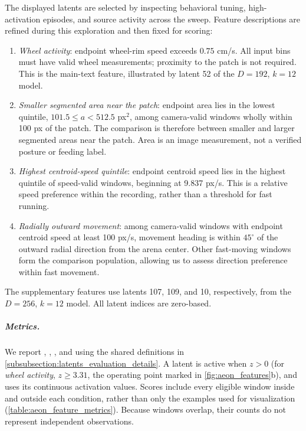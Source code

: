 The displayed latents are selected by inspecting behavioral tuning, high-activation episodes, and source activity across the sweep. Feature descriptions are refined during this exploration and then fixed for scoring:
\begin{enumerate}[leftmargin=*,itemsep=2pt]
    \item \textit{Wheel activity}: endpoint wheel-rim speed exceeds $0.75$ cm/s. All input bins must have valid wheel measurements; proximity to the patch is not required. This is the main-text feature, illustrated by latent 52 of the $D=192$, $k=12$ model.
    \item \textit{Smaller segmented area near the patch}: endpoint area lies in the lowest quintile, $101.5\leq a<512.5$ px$^2$, among camera-valid windows wholly within 100 px of the patch. The comparison is therefore between smaller and larger segmented areas near the patch. Area is an image measurement, not a verified posture or feeding label.
    \item \textit{Highest centroid-speed quintile}: endpoint centroid speed lies in the highest quintile of speed-valid windows, beginning at 9.837 px/s. This is a relative speed preference within the recording, rather than a threshold for fast running.
    \item \textit{Radially outward movement}: among camera-valid windows with endpoint centroid speed at least 100 px/s, movement heading is within $45^\circ$ of the outward radial direction from the arena center. Other fast-moving windows form the comparison population, allowing us to assess direction preference within fast movement.
\end{enumerate}
The supplementary features use latents 107, 109, and 10, respectively, from the $D=256$, $k=12$ model. All latent indices are zero-based.

\subparagraph{Metrics.}
We report , , , and  using the shared definitions in \hyperref[subsubsection:latents_evaluation_details]{\ref*{subsubsection:latents_evaluation_details}}. A latent is active when $z>0$ (for \textit{wheel activity}, $z\geq3.31$, the operating point marked in \autoref{fig:aeon_features}b), and  uses its continuous activation values. Scores include every eligible window inside and outside each condition, rather than only the examples used for visualization (\autoref{table:aeon_feature_metrics}). Because windows overlap, their counts do not represent independent observations.

